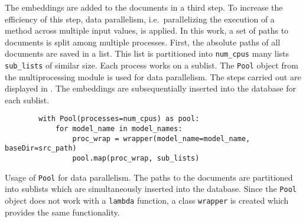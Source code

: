 
The embeddings are added to the documents in a third step.
To increase the efficiency of this step, data parallelism, i.e.\ parallelizing the execution of a method across multiple input values, is applied.
In this work, a set of paths to documents is split among multiple processes.
First, the absolute paths of all documents are saved in a list.
This list is partitioned into \texttt{num\_cpus} many lists \texttt{sub\_lists} of similar size.
Each process works on a sublist.
The \texttt{Pool} object from the multiprocessing module is used for data parallelism.
The steps carried out are displayed in .
The embeddings are subsequentially inserted into the database for each sublist. 

\begin{listing}[htp]
    \begin{verbatim}
        with Pool(processes=num_cpus) as pool:
            for model_name in model_names:
                proc_wrap = wrapper(model_name=model_name, baseDir=src_path)
                pool.map(proc_wrap, sub_lists)
    \end{verbatim}
    \caption[Usage of \texttt{Pool} for data parallelism]
    {Usage of \texttt{Pool} for data parallelism.
    The paths to the documents are partitioned into sublists which are simultaneously inserted into the database.
    Since the \texttt{Pool} object does not work with a \texttt{lambda} function, 
    a class \texttt{wrapper} is created which provides the same functionality.
    }
    \label{lst:db_Pool_embeddings}
\end{listing}


